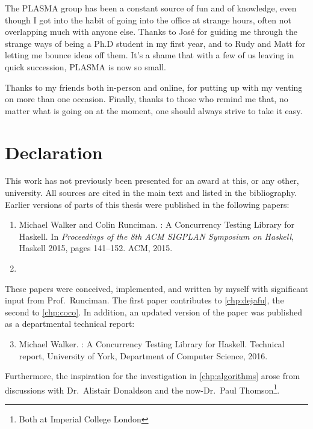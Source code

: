The PLASMA group has been a constant source of fun and of knowledge,
even though I got into the habit of going into the office at strange
hours, often not overlapping much with anyone else.  Thanks to Jos\'e
for guiding me through the strange ways of being a Ph.D student in my
first year, and to Rudy and Matt for letting me bounce ideas off them.
It's a shame that with a few of us leaving in quick succession, PLASMA
is now so small.

Thanks to my friends both in-person and online, for putting up with my
venting on more than one occasion.  Finally, thanks to those who
remind me that, no matter what is going on at the moment, one should
always strive to take it easy.

\chapter*{Declaration}

This work has not previously been presented for an award at this, or
any other, university.  All sources are cited in the main text and
listed in the bibliography.  Earlier versions of parts of this thesis
were published in the following papers:

\begin{enumerate}
\item Michael Walker and Colin Runciman. \dejafu{}: A Concurrency
  Testing Library for Haskell.  In \emph{Proceedings of the 8th ACM
    SIGPLAN Symposium on Haskell}, Haskell 2015, pages 141--152.  ACM,
  2015.\nocite{walker2015}
\item {}
\end{enumerate}

These papers were conceived, implemented, and written by myself with
significant input from Prof.~Runciman.  The first paper contributes to
\cref{chp:dejafu}, the second to \cref{chp:coco}.  In addition, an
updated version of the \dejafu{} paper was published as a departmental
technical report:

\begin{enumerate}
\setcounter{enumi}{2}
\item Michael Walker. \dejafu{}: A Concurrency Testing Library for
  Haskell.  Technical report, University of York, Department of
  Computer Science, 2016.\nocite{YCS-2016-503}
\end{enumerate}

Furthermore, the inspiration for the investigation in
\cref{chp:algorithms} arose from discussions with Dr.~Alistair
Donaldson and the now-Dr.~Paul Thomson\footnote{Both at Imperial
  College London}.
